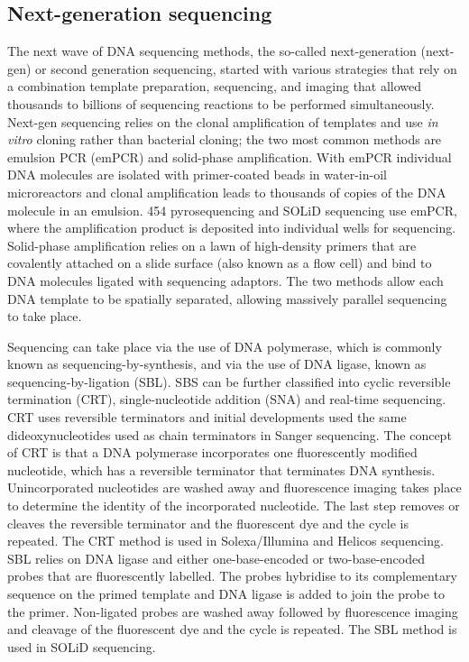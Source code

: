 \subsection{Next-generation sequencing}

The next wave of DNA sequencing methods, the so-called next-generation (next-gen) or second generation sequencing, started with various strategies that rely on a combination template preparation, sequencing, and imaging that allowed thousands to billions of sequencing reactions to be performed simultaneously\cite{pmid19997069}. Next-gen sequencing relies on the clonal amplification of templates and use \textit{in vitro} cloning rather than bacterial cloning; the two most common methods are emulsion PCR (emPCR)\cite{pmid12857956} and solid-phase amplification\cite{pmid16473845}. With emPCR individual DNA molecules are isolated with primer-coated beads in water-in-oil microreactors and clonal amplification leads to thousands of copies of the DNA molecule in an emulsion. 454 pyrosequencing and SOLiD sequencing use emPCR, where the amplification product is deposited into individual wells for sequencing. Solid-phase amplification relies on a lawn of high-density primers that are covalently attached on a slide surface (also known as a flow cell) and bind to DNA molecules ligated with sequencing adaptors. The two methods allow each DNA template to be spatially separated, allowing massively parallel sequencing to take place.

Sequencing can take place via the use of DNA polymerase, which is commonly known as sequencing-by-synthesis, and via the use of DNA ligase, known as sequencing-by-ligation (SBL). SBS can be further classified into cyclic reversible termination (CRT), single-nucleotide addition (SNA) and real-time sequencing\cite{pmid19997069}. CRT uses reversible terminators and initial developments used the same dideoxynucleotides used as chain terminators in Sanger sequencing. The concept of CRT is that a DNA polymerase incorporates one fluorescently modified nucleotide, which has a reversible terminator that terminates DNA synthesis. Unincorporated nucleotides are washed away and fluorescence imaging takes place to determine the identity of the incorporated nucleotide. The last step removes or cleaves the reversible terminator and the fluorescent dye and the cycle is repeated. The CRT method is used in Solexa/Illumina and Helicos sequencing. SBL relies on DNA ligase and either one-base-encoded or two-base-encoded probes that are fluorescently labelled. The probes hybridise to its complementary sequence on the primed template and DNA ligase is added to join the probe to the primer. Non-ligated probes are washed away followed by fluorescence imaging and cleavage of the fluorescent dye and the cycle is repeated. The SBL method is used in SOLiD sequencing.

